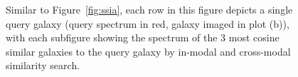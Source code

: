 \begin{figure}[htb]
    \centering
    \caption{Similar to Figure~\eqref{fig:ssia}, each row in this figure depicts a single query galaxy (query spectrum in red,
        galaxy imaged in plot (b)), with each subfigure showing the spectrum of the 3 most cosine similar galaxies to the
        query galaxy by in-modal and cross-modal similarity search.}
    \label{fig:sss}
\end{figure}
